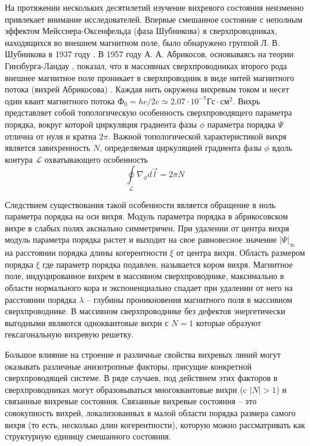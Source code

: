 На протяжении нескольких десятилетий изучение вихревого состояния неизменно 
привлекает внимание исследователей. Впервые смешанное состояние с неполным 
эффектом Мейсснера-Оксенфельда (фаза Шубникова) в сверхпроводниках, 
находящихся во внешнем магнитном поле, было обнаружено группой Л. В. 
Шубникова в 1937 году \cite{shubnikov}. В 1957 году А. А. Абрикосов, 
основываясь на теории Гинзбурга-Ландау \cite{ginzburg-landau}, показал, что в 
массивных сверхпроводниках второго рода внешнее магнитное поле проникает в 
сверхпроводник в виде нитей магнитного потока (вихрей Абрикосова)
\cite{abrikosov}. Каждая нить окружена вихревым током и несет один квант 
магнитного потока 
\( Ф_0 = hc/2e \simeq 2.07\cdot10^{-7} \text{Гс}\cdot\text{см}^2 \). Вихрь 
представляет собой топологическую особенность сверхпроводящего параметра 
порядка, вокруг которой циркуляция градиента фазы \( \phi \) параметра порядка 
\( \Psi \) отлична от нуля и кратна \( 2\pi \). Важной топологической 
характеристикой вихря является завихренность \( N \), определяемая циркуляцией 
градиента фазы \( \phi \) вдоль контура \( \mathcal{L} \) охватывающего 
особенность 
\begin{equation}
    \oint\limits_{\mathcal{L}} \nabla_\phi d\vec{l} = 2\pi N
\end{equation}

Следствием существования такой особенности является обращение в ноль параметра 
порядка на оси вихря. Модуль параметра порядка в абрикосовском вихре в слабых 
полях аксиально симметричен. При удалении от центра вихря модуль параметра 
порядка растет и выходит на свое равновесное значение \( |\Psi|_\infty \) на 
расстоянии порядка длины когерентности \( \xi \) от центра вихря. Область 
размером порядка \( \xi \) где параметр порядка подавлен, называется кором 
вихря. Магнитное поле, индуцированное вихрем в массивном сверхпроводнике, 
максимально в области нормального кора и экспоненциально спадает при удалении 
от него на расстоянии порядка \( \lambda \) -- глубины проникновения магнитного 
поля в массивном сверхпроводнике. В массивном сверхпроводнике без дефектов 
энергетически выгодными являются одноквантовые вихри с \( N = 1 \) которые 
образуют гексагональную вихревую решетку.

Большое влияние на строение и различные свойства вихревых линий могут 
оказывать различные анизотропные факторы, присущие конкретной сверхпроводящей 
системе. В ряде случаев, под действием этих факторов в сверхпроводниках могут 
образовываться многоквантовые вихри (c \( |N| > 1 \)) и связанные вихревые
состояния. Связанные вихревые состояния -- это совокупность вихрей, 
локализованных в малой области порядка размера самого вихря (то есть, 
несколько длин когерентности), которую можно рассматривать как структурную 
единицу смешанного состояния.

